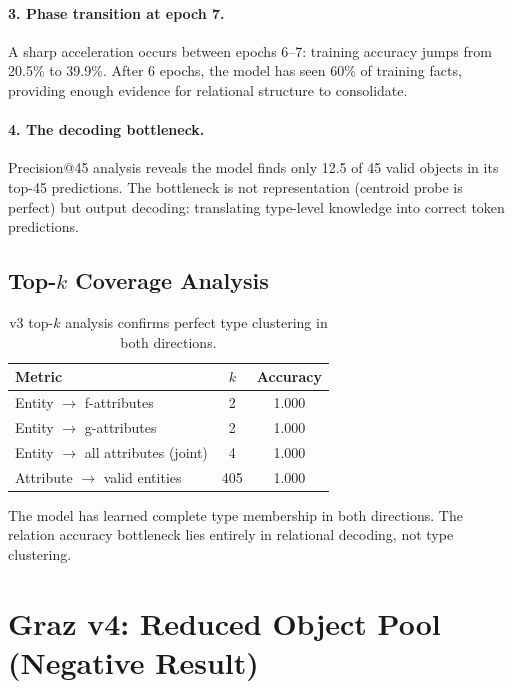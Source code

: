 \documentclass[11pt]{article}
\begin{document}
\paragraph{3. Phase transition at epoch 7.}
A sharp acceleration occurs between epochs 6--7: training accuracy jumps from 20.5\%
to 39.9\%.  After 6 epochs, the model has seen 60\% of training facts, providing enough
evidence for relational structure to consolidate.

\paragraph{4. The decoding bottleneck.}
Precision@45 analysis reveals the model finds only 12.5 of 45 valid objects in its
top-45 predictions. The bottleneck is not representation (centroid probe is perfect)
but output decoding: translating type-level knowledge into correct token predictions.

\subsection{Top-$k$ Coverage Analysis}

\begin{table}[h]
\centering
\caption{v3 top-$k$ analysis confirms perfect type clustering in both directions.}
\begin{tabular}{lcc}
\toprule
Metric & $k$ & Accuracy \\
\midrule
Entity $\to$ f-attributes & 2 & 1.000 \\
Entity $\to$ g-attributes & 2 & 1.000 \\
Entity $\to$ all attributes (joint) & 4 & 1.000 \\
Attribute $\to$ valid entities & 405 & 1.000 \\
\bottomrule
\end{tabular}
\end{table}

The model has learned complete type membership in both directions.  The relation
accuracy bottleneck lies entirely in relational decoding, not type clustering.

\section{Graz v4: Reduced Object Pool (Negative Result)}
\label{sec:v4}
\end{document}
